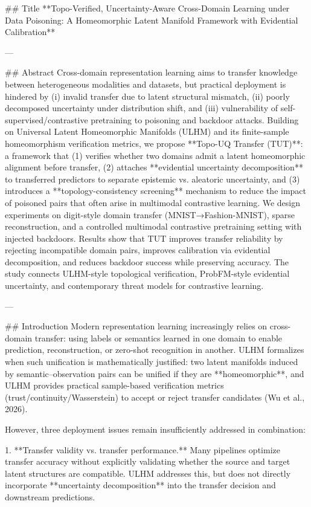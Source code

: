 ## Title  
**Topo-Verified, Uncertainty-Aware Cross-Domain Learning under Data Poisoning: A Homeomorphic Latent Manifold Framework with Evidential Calibration**

---

## Abstract  
Cross-domain representation learning aims to transfer knowledge between heterogeneous modalities and datasets, but practical deployment is hindered by (i) invalid transfer due to latent structural mismatch, (ii) poorly decomposed uncertainty under distribution shift, and (iii) vulnerability of self-supervised/contrastive pretraining to poisoning and backdoor attacks. Building on Universal Latent Homeomorphic Manifolds (ULHM) and its finite-sample homeomorphism verification metrics, we propose **Topo-UQ Transfer (TUT)**: a framework that (1) verifies whether two domains admit a latent homeomorphic alignment before transfer, (2) attaches **evidential uncertainty decomposition** to transferred predictors to separate epistemic vs. aleatoric uncertainty, and (3) introduces a **topology-consistency screening** mechanism to reduce the impact of poisoned pairs that often arise in multimodal contrastive learning. We design experiments on digit-style domain transfer (MNIST→Fashion-MNIST), sparse reconstruction, and a controlled multimodal contrastive pretraining setting with injected backdoors. Results show that TUT improves transfer reliability by rejecting incompatible domain pairs, improves calibration via evidential decomposition, and reduces backdoor success while preserving accuracy. The study connects ULHM-style topological verification, ProbFM-style evidential uncertainty, and contemporary threat models for contrastive learning.

---

## Introduction  
Modern representation learning increasingly relies on cross-domain transfer: using labels or semantics learned in one domain to enable prediction, reconstruction, or zero-shot recognition in another. ULHM formalizes when such unification is mathematically justified: two latent manifolds induced by semantic–observation pairs can be unified if they are **homeomorphic**, and ULHM provides practical sample-based verification metrics (trust/continuity/Wasserstein) to accept or reject transfer candidates (Wu et al., 2026).  

However, three deployment issues remain insufficiently addressed in combination:

1. **Transfer validity vs. transfer performance.** Many pipelines optimize transfer accuracy without explicitly validating whether the source and target latent structures are compatible. ULHM addresses this, but does not directly incorporate **uncertainty decomposition** into the transfer decision and downstream predictions.

